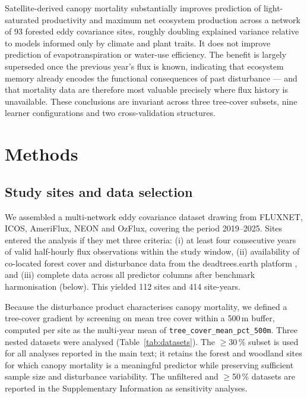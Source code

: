 \documentclass[pdflatex,sn-nature]{sn-jnl}%
\theoremstyle{thmstyleone}%
\theoremstyle{thmstyletwo}%
\theoremstyle{thmstylethree}%
\begin{document}
Satellite-derived canopy mortality substantially improves prediction of light-saturated productivity and maximum net ecosystem production across a network of 93 forested eddy covariance sites, roughly doubling explained variance relative to models informed only by climate and plant traits. It does not improve prediction of evapotranspiration or water-use efficiency. The benefit is largely superseded once the previous year's flux is known, indicating that ecosystem memory already encodes the functional consequences of past disturbance --- and that mortality data are therefore most valuable precisely where flux history is unavailable. These conclusions are invariant across three tree-cover subsets, nine learner configurations and two cross-validation structures.

\section{Methods}\label{sec11}

\subsection*{Study sites and data selection}

We assembled a multi-network eddy covariance dataset drawing from FLUXNET, ICOS, AmeriFlux, NEON and OzFlux, covering the period 2019--2025. Sites entered the analysis if they met three criteria: (i) at least four consecutive years of valid half-hourly flux observations within the study window, (ii) availability of co-located forest cover and disturbance data from the deadtrees.earth platform \cite{mosig2026deadtrees}, and (iii) complete data across all predictor columns after benchmark harmonisation (below). This yielded 112 sites and 414 site-years.

Because the disturbance product characterises canopy mortality, we defined a tree-cover gradient by screening on mean tree cover within a 500\,m buffer, computed per site as the multi-year mean of \texttt{tree\_cover\_mean\_pct\_500m}. Three nested datasets were analysed (Table~\ref{tab:datasets}). The $\geq$30\,\% subset is used for all analyses reported in the main text; it retains the forest and woodland sites for which canopy mortality is a meaningful predictor while preserving sufficient sample size and disturbance variability. The unfiltered and $\geq$50\,\% datasets are reported in the Supplementary Information as sensitivity analyses.
\end{document}
